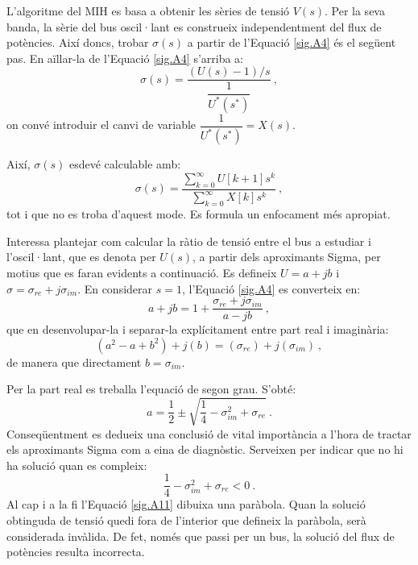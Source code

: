 L'algoritme del MIH es basa a obtenir les sèries de tensió $V(s)$. Per la seva banda, la sèrie del bus oscil·lant es construeix independentment del flux de potències. Així doncs, trobar $\sigma(s)$ a partir de l'Equació \ref{sig.A4} és el següent pas. En aïllar-la de l'Equació \ref{sig.A4} s'arriba a: 
\begin{equation}
    \sigma(s)=\frac{(U(s)-1)/s}{\dfrac{1}{U^*(s^*)}}\ ,
    \label{sig.A6}
\end{equation}
on convé introduir el canvi de variable $\dfrac{1}{U^*(s^*)}=X(s)$. 

Així, $\sigma(s)$ esdevé calculable amb:
\begin{equation}
    \sigma(s)=\frac{\sum_{k=0}^{\infty}U[k+1]s^k}{\sum_{k=0}^{\infty}X[k]s^k}\ ,
    \label{sig.A7}
\end{equation}
tot i que no es troba d'aquest mode. Es formula un enfocament més apropiat. 

Interessa plantejar com calcular la ràtio de tensió entre el bus a estudiar i l'oscil·lant, que es denota per $U(s)$, a partir dels aproximants Sigma, per motius que es faran evidents a continuació. Es defineix $U=a+jb$ i $\sigma=\sigma_{re}+j\sigma_{im}$. En considerar $s=1$, l'Equació \ref{sig.A4} es converteix en:
\begin{equation}
a+jb=1+\frac{\sigma_{re}+j\sigma_{im}}{a-jb}\ ,
\label{sig.A8}
\end{equation}
que en desenvolupar-la i separar-la explícitament entre part real i imaginària: 
\begin{equation}
(a^2-a+b^2)+j(b)=(\sigma_{re})+j(\sigma_{im})\ ,
\label{sig.A9}
\end{equation}
de manera que directament $b=\sigma_{im}$. 

Per la part real es treballa l'equació de segon grau. S'obté:
\begin{equation}
    a=\frac{1}{2}\pm\sqrt{\frac{1}{4}-\sigma^2_{im}+\sigma_{re}}\ .
\label{sig.A10}
\end{equation}
Conseqüentment es dedueix una conclusió de vital importància a l'hora de tractar els aproximants Sigma com a eina de diagnòstic. Serveixen per indicar que no hi ha solució quan es compleix:
\begin{equation}
\frac{1}{4}-\sigma^2_{im}+\sigma_{re}<0\ .
\label{sig.A11}
\end{equation}
Al cap i a la fi l'Equació \ref{sig.A11} dibuixa una paràbola. Quan la solució obtinguda de tensió quedi fora de l'interior que defineix la paràbola, serà considerada invàlida. De fet, només que passi per un bus, la solució del flux de potències resulta incorrecta. 

